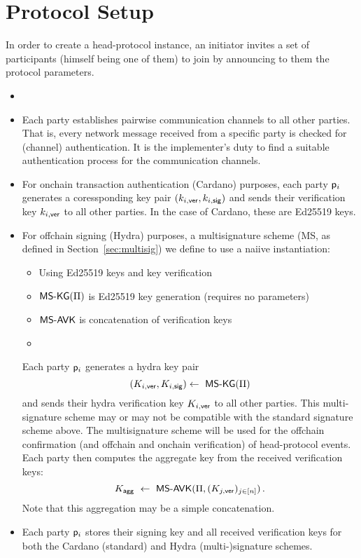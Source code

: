 
\section{Protocol Setup}\label{sec:hpsetup}
In order to create a head-protocol instance, an initiator invites a set of
participants (himself being one of them) to join by announcing to them the
protocol parameters.

\begin{itemize}
  \item {}

  \item Each party establishes pairwise communication channels to all other parties. That is, every network message received from a specific party is checked for (channel) authentication. It is the implementer’s duty to find a suitable authentication process for the communication channels.

  \item For onchain transaction authentication (Cardano) purposes, each party $\mathsf p_i$ generates a
        coressponding key pair $(k_{i,\mathsf{ver}},k_{i,\mathsf{sig}})$ and sends their verification key $k_{i,\mathsf{ver}}$ to all other parties. In the case of Cardano, these are Ed25519 keys.

  \item For offchain signing (Hydra) purposes, a multisignature scheme (MS, as defined in Section~\ref{sec:multisig}) we define to use a naiive instantiation:
        \begin{itemize}
          \item Using Ed25519 keys and key verification
          \item $\mathsf{MS\textsf{-}{}KG}(\Pi)$ is Ed25519 key generation (requires no parameters)
          \item $\mathsf{MS\textsf{-}{}AVK}$ is concatenation of verification keys
          \item {}
        \end{itemize}
  
        Each party $\mathsf p_i$ generates a hydra key pair
        \[
          (K_{i,\mathsf{ver}},K_{i,\mathsf{sig}})  \gets \ \mathsf{MS\textsf{-}{}KG}(\Pi)
        \]
        and sends their hydra verification key $K_{i,\mathsf{ver}}$ to all other parties. This
        multi-signature scheme may or may not be compatible with the standard
        signature scheme above. The multisignature scheme will be used for the
        offchain confirmation (and offchain and onchain verification) of
        head-protocol events. Each party then computes the aggregate key from the received
        verification keys:
        \[
          \hpAK \ \gets \ \msCombVK(\msParams,(\daPuI{j})_{j\in[n]}) \,.
        \]
        Note that this aggregation may be a simple concatenation.

  \item Each party $\mathsf p_i$ stores their signing key and all received
        verification keys for both the Cardano (standard) and Hydra
        (multi-)signature schemes.
\end{itemize}


